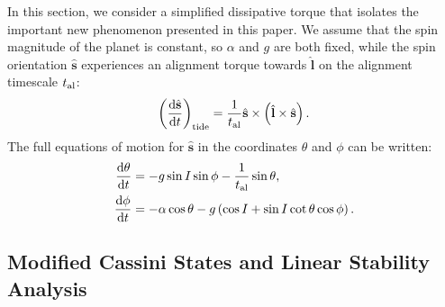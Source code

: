 \documentclass[
        fleqn,
        usenatbib,
        referee,
    ]{mnras}
\newcommand*{\rd}[2]{\frac{\mathrm{d}#1}{\mathrm{d}#2}}
\newcommand*{\p}[1]{\left(#1\right)}
\newcommand*{\uv}[1]{\hat{\boldsymbol{\mathbf{#1}}}}
\begin{document}
In this section, we consider a simplified dissipative torque that isolates the
important new phenomenon presented in this paper. We assume that the spin
magnitude of the planet is constant, so $\alpha$ and $g$ are both fixed, while
the spin orientation $\uv{s}$ experiences an alignment torque towards $\uv{l}$
on the alignment timescale $t_{\rm al}$:
\begin{equation}
    \p{\rd{\uv{s}}{t}}_{\rm tide}
        = \frac{1}{t_{\rm al}} \uv{s} \times \p{\uv{l} \times \uv{s}}.
        \label{eq:dsdt_tide_toy}
\end{equation}
The full equations of motion for $\uv{s}$ in the coordinates $\theta$ and $\phi$
can be written:
\begin{align}
    \rd{\theta}{t} &= -g\sin I \sin \phi - \frac{1}{t_{\rm al}} \sin \theta,
        \label{eq:dqdt_toy}\\
    \rd{\phi}{t} &= -\alpha \cos\theta
        - g\p{\cos I + \sin I \cot \theta \cos \phi}.\label{eq:dfdt_toy}
\end{align}

\subsection{Modified Cassini States and Linear Stability
Analysis}\label{ss:tidal_equils}
\end{document}
